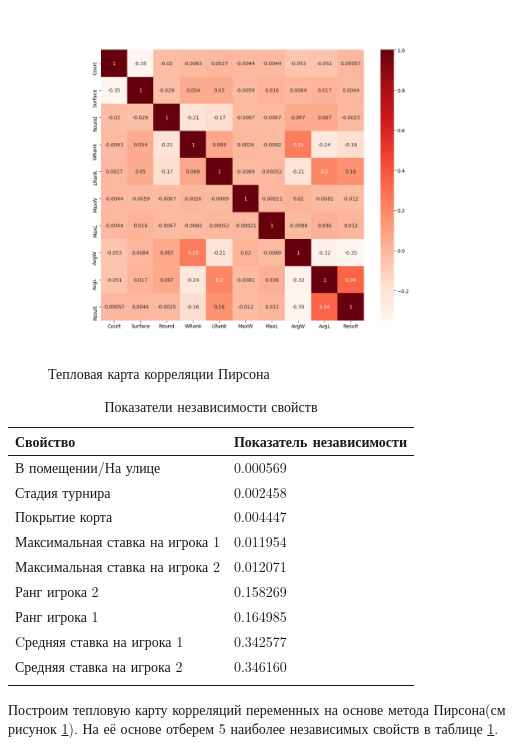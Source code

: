 \begin{figure}[!h]
	\centering
	\includegraphics[width=.8\textwidth]{master_img/heatmap.png}
	\caption{Тепловая карта корреляции Пирсона}
	\label{fig03}
\end{figure}
\begin{longtable}{|l|l|}
			
			\hline
			
			Свойство& Показатель независимости \\
			
			\hline 
			
			В помещении/На улице & 0.000569 \\ \hline
			Стадия турнира & 0.002458 \\ \hline
			Покрытие корта & 0.004447 \\ \hline
			Максимальная ставка на игрока 1 & 0.011954 \\ \hline
			Максимальная ставка на игрока 2 & 0.012071 \\ \hline
			Ранг игрока 2 & 0.158269 \\ \hline
			Ранг игрока 1 & 0.164985 \\ \hline
			Cредняя ставка на игрока 1 & 0.342577 \\ \hline
			Средняя ставка на игрока 2 & 0.346160 \\ \hline

		

	\caption{Показатели независимости свойств}
	\label{tab:tablepearson}
\end{longtable}
Построим тепловую карту корреляций переменных на основе метода Пирсона(см рисунок \ref{fig03}).
На её основе отберем 5 наиболее независимых свойств в таблице \ref{tab:tablepearson}.


